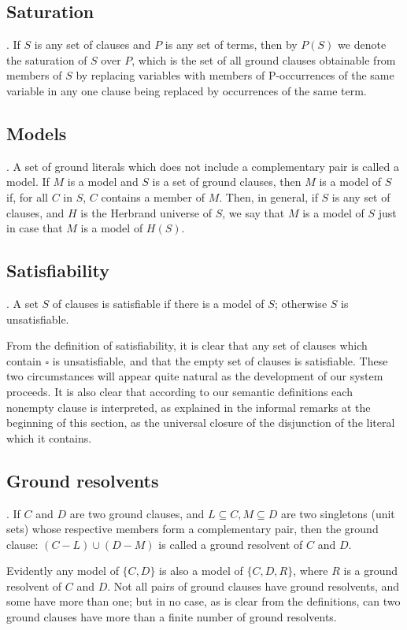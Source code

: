 \documentclass[8pt]{extarticle}
\begin{document}
\subsection{Saturation}. If $S$ is any set of clauses and $P$ is any set of terms, then by $P(S)$ we denote the saturation of $S$ over $P$, which is the set of all ground clauses obtainable from members of $S$ by replacing variables with members of P-occurrences of the same variable in any one clause being replaced by occurrences of the same term.

\subsection{Models}. A set of ground literals which does not include a complementary pair is called a model. If $M$ is a model and $S$ is a set of ground clauses, then $M$ is a model of $S$ if, for all $C$ in $S$, $C$ contains a member of $M$. Then, in general, if $S$ is any set of clauses, and $H$ is the Herbrand universe of $S$, we say that $M$ is a model of $S$ just in case that $M$ is a model of $H(S)$.

\subsection{Satisfiability}. A set $S$ of clauses is satisfiable if there is a model of $S$; otherwise $S$ is unsatisfiable.

From the definition of satisfiability, it is clear that any set of clauses which contain $\square$ is unsatisfiable, and that the empty set of clauses is satisfiable. These two circumstances will appear quite natural as the development of our system proceeds. It is also clear that according to our semantic definitions each nonempty clause is interpreted, as explained in the informal remarks at the beginning of this section, as the universal closure of the disjunction of the literal which it contains.

\subsection{Ground resolvents}. If $C$ and $D$ are two ground clauses, and $L\subseteq C,M\subseteq D$ are two singletons (unit sets) whose respective members form a complementary pair, then the ground clause: $(C - L)\cup (D - M)$ is called a ground resolvent of $C$ and $D$.

Evidently any model of $\{C,D\}$ is also a model of $\{C,D,R\}$, where $R$ is a ground resolvent of $C$ and $D$. Not all pairs of ground clauses have ground resolvents, and some have more than one; but in no case, as is clear from the definitions, can two ground clauses have more than a finite number of ground resolvents.
\end{document}
